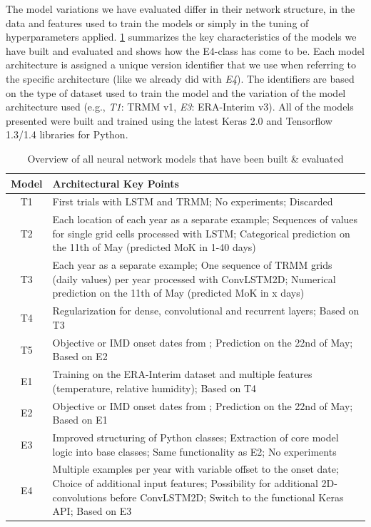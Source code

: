 The model variations we have evaluated differ in their network structure, in the data and features used to train the models or simply in the tuning of hyperparameters applied. \cref{tab:nn_overall_summary} summarizes the key characteristics of the models we have built and evaluated and shows how the E4-class has come to be. Each model architecture is assigned a unique version identifier that we use when referring to the specific architecture (like we already did with \textit{E4}). The identifiers are based on the type of dataset used to train the model and the variation of the model architecture used (e.g., \textit{T1}: TRMM v1, \textit{E3}: ERA-Interim v3). All of the models presented were built and trained using the latest Keras 2.0 and Tensorflow 1.3/1.4 libraries for Python.

\begin{table}[h]
  \begin{tabularx}{\linewidth}{c|X}
    \toprule
    \textbf{Model} & \textbf{Architectural Key Points} \\
    \midrule
    T1 & First trials with LSTM and TRMM; No experiments; Discarded \\
    T2 & Each location of each year as a separate example; Sequences of values for single grid cells processed with LSTM; Categorical prediction on the 11th of May (predicted MoK in 1-40 days) \\
    T3 & Each year as a separate example; One sequence of TRMM grids (daily values) per year processed with ConvLSTM2D; Numerical prediction on the 11th of May (predicted MoK in x days) \\
    T4 & Regularization for dense, convolutional and recurrent layers; Based on T3 \\
    T5 & Objective or IMD onset dates from \citet{Singh.2009}; Prediction on the 22nd of May; Based on E2 \\
    \midrule
    E1 & Training on the ERA-Interim dataset and multiple features (temperature, relative humidity); Based on T4 \\
    E2 & Objective or IMD onset dates from \citet{Singh.2009}; Prediction on the 22nd of May; Based on E1 \\
    E3 & Improved structuring of Python classes; Extraction of core model logic into base classes; Same functionality as E2; No experiments \\
    E4 & Multiple examples per year with variable offset to the onset date; Choice of additional input features; Possibility for additional 2D-convolutions before ConvLSTM2D; Switch to the functional Keras API; Based on E3 \\
    \bottomrule
  \end{tabularx}
  \caption{Overview of all neural network models that have been built \& evaluated}
  \label{tab:nn_overall_summary}
\end{table}


